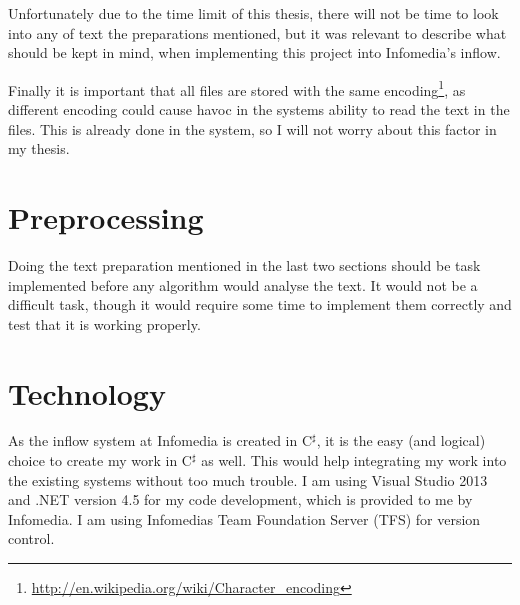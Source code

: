 Unfortunately due to the time limit of this thesis, there will not be time to look into any of text the preparations mentioned, but it was relevant to describe what should be kept in mind, when implementing this project into Infomedia's inflow.

Finally it is important that all files are stored with the same encoding\footnote{\url{http://en.wikipedia.org/wiki/Character_encoding}}, as different encoding could cause havoc in the systems ability to read the text in the files. This is already done in the system, so I will not worry about this factor in my thesis.

\section{Preprocessing}
Doing the text preparation mentioned in the last two sections should be task implemented before any algorithm would analyse the text. It would not be a difficult task, though it would require some time to implement them correctly and test that it is working properly.

\section{Technology}
As the inflow system at Infomedia is created in C$^\sharp$, it is the easy (and logical) choice to create my work in C$^\sharp$ as well. This would help integrating my work into the existing systems without too much trouble. I am using Visual Studio 2013 and .NET version 4.5 for my code development, which is provided to me by Infomedia. I am using Infomedias Team Foundation Server (TFS) for version control. 








